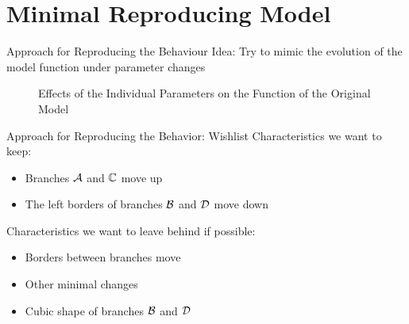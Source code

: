 
\section{Minimal Reproducing Model}

\begin{frame}{Approach for Reproducing the Behaviour}
    Idea:
    Try to mimic the evolution of the model function under parameter changes

    \vspace{-2.0em}
    \begin{figure}
        \centering
        \caption{Effects of the Individual Parameters on the Function of the Original Model}
    \end{figure}
\end{frame}

\begin{frame}{Approach for Reproducing the Behavior: Wishlist}
    Characteristics we want to keep:
    \begin{itemize}
        \item Branches $\mathcal{A}$ and $\mathbb{C}$ move up
        \item The left borders of branches $\mathcal{B}$ and $\mathcal{D}$ move down
    \end{itemize}

    \vspace{2em}
    Characteristics we want to leave behind if possible:
    \begin{itemize}
        \item Borders between branches move
        \item Other minimal changes
        \item Cubic shape of branches $\mathcal{B}$ and $\mathcal{D}$
    \end{itemize}
\end{frame}

